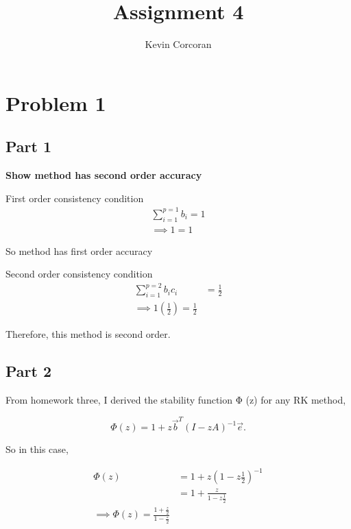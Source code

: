\documentclass[12pt,a4paper]{article}
\title{Assignment 4}
\author{ Kevin Corcoran }
\begin{document}
\maketitle

\section{Problem 1}%
\label{sec:problem_1}

\subsection{Part 1}%
\label{sub:part_1}

\textbf{Show method has second order accuracy} 

\par First order consistency condition 
\begin{align*}
  \sum^{p=1}_{i=1} b_i = 1 \\
  \implies 1 = 1
\end{align*}

So method has first order accuracy

\vspace{15px}
\par Second order consistency condition
\begin{align*}
  \sum^{p=2}_{i=1} b_i c_i &= \frac{1}{2} \\
  \implies 1(\frac{1}{2}) = \frac{1}{2}
\end{align*}

Therefore, this method is second order.

\subsection{Part 2}%
\label{sub:part_2}

\par From homework three, I derived the stability function  Φ (z)  for any RK
method,

\[
\Phi (z) = 1 +z \vec{b}^{T}  (I-zA)^{-1}   \vec{e}
.\] 

\par So in this case,

\begin{align*}
  \Phi (z) &= 1 + z (1-z\frac{1}{2})^{-1} \\
           &= 1 + \frac{z}{1-z \frac{1}{2}} \\
           \implies \boxed{\Phi (z) = \frac{ 1 + \frac{z}{2} }{1 - \frac{z}{2}}}
\end{align*}
\end{document}
